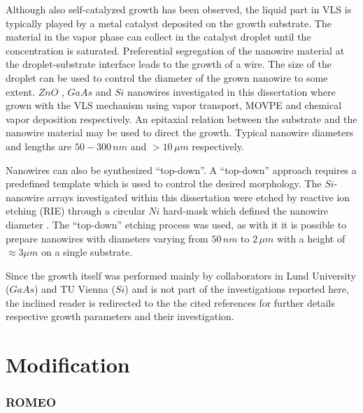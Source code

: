 Although also self-catalyzed growth has been observed, the liquid part in VLS is typically played by a metal catalyst deposited on the growth substrate. The material in the vapor phase can collect in the catalyst droplet until the concentration is saturated. Preferential segregation of the nanowire material at the droplet-substrate interface leads to the growth of a wire. The size of the droplet can be used to control the diameter of the grown nanowire to some extent. $ZnO$ \cite{borchers_catalyst_2006, stichtenoth_dimensionseffekte_2008, muller_structural_2009,ogrisek_kontrolliertes_2013}, $GaAs$ \cite{borgstrom_size-_2004, wacaser_preferential_2009} and $Si$ \cite{lugstein_pressure-induced_2008} nanowires investigated in this dissertation where grown with the VLS mechanism using vapor transport, MOVPE and chemical vapor deposition respectively. An epitaxial relation between the substrate and the nanowire material may be used to direct the growth. Typical nanowire diameters and lengths are $50 - 300\,nm$ and $> 10\,\mu m$ respectively.

Nanowires can also be synthesized ``top-down''. A ``top-down'' approach requires a predefined template which is used to control the desired morphology. The $Si$-nanowire arrays investigated within this dissertation were etched by reactive ion etching (RIE) through a circular $Ni$ hard-mask which defined the nanowire diameter . The ``top-down'' etching process was used, as with it it is possible to prepare nanowires with diameters varying from $50\,nm$ to $2\,\mu m$ with a height of $\approx 3\mu m$ on a single substrate. 

Since the growth itself was performed mainly by collaborators in Lund University ($GaAs$) and TU Vienna ($Si$) and is not part of the investigations reported here, the inclined reader is redirected to the the cited references for further details respective growth parameters and their investigation.

\section{Modification}

\subsubsection{ROMEO}


